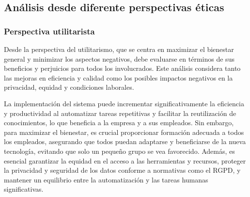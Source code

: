 \subsection{Análisis desde diferente perspectivas éticas}
\subsubsection{Perspectiva utilitarista}
Desde la perspectiva del utilitarismo, que se centra en maximizar el bienestar 
general y minimizar los aspectos negativos, debe evaluarse en términos de sus 
beneficios y perjuicios para todos los involucrados. Este análisis considera tanto 
las mejoras en eficiencia y calidad como los posibles impactos negativos en la 
privacidad, equidad y condiciones laborales.

La implementación del sistema puede incrementar significativamente la eficiencia 
y productividad al automatizar tareas repetitivas y facilitar la reutilización 
de conocimientos, lo que beneficia a la empresa y a sus empleados. Sin embargo, 
para maximizar el bienestar, es crucial proporcionar formación adecuada a todos 
los empleados, asegurando que todos puedan adaptarse y beneficiarse de la nueva 
tecnología, evitando que solo un pequeño grupo se vea favorecido. Además, es 
esencial garantizar la equidad en el acceso a las herramientas y recursos, proteger 
la privacidad y seguridad de los datos conforme a normativas como el RGPD, y 
mantener un equilibrio entre la automatización y las tareas humanas significativas. 
